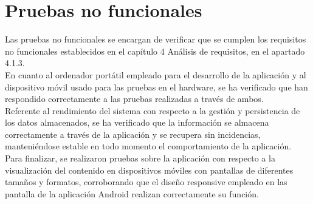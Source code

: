 \section{Pruebas no funcionales}

Las pruebas no funcionales se encargan de verificar que se cumplen los requisitos no funcionales establecidos en el capítulo 4 Análisis de requisitos, en el apartado 4.1.3.\\

En cuanto al ordenador portátil empleado para el desarrollo de la aplicación y al dispositivo móvil usado para las pruebas en el hardware, se ha verificado que han respondido correctamente a las pruebas realizadas a través de ambos.\\

Referente al rendimiento del sistema con respecto a la gestión y persistencia de los datos almacenados, se ha verificado que la información se almacena correctamente a través de la aplicación y se recupera sin incidencias, manteniéndose estable en todo momento el comportamiento de la aplicación.\\

Para finalizar, se realizaron pruebas sobre la aplicación con respecto a la visualización del contenido en dispositivos móviles con pantallas de diferentes tamaños y formatos, corroborando que el diseño responsive empleado en las pantalla de la aplicación Android realizan correctamente su función.
